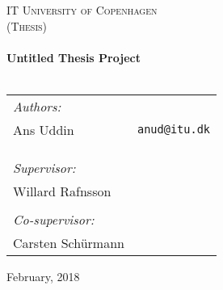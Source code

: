 \begin{center}
  \thispagestyle{empty}

  \textsc{\LARGE IT University of Copenhagen}\\[0.5cm]
  \textsc{\Large  (Thesis)}\\[2cm]

  \HRule\\[0.4cm]
  {\huge \bfseries Untitled Thesis Project \\ [0.4cm]}
  \HRule\\[3cm]

  \begin{tabular}{lr}
  	\textit{Authors:} \\
    Ans Uddin                     & \texttt{anud@itu.dk} \\
    \\
    \\
    \\
    \textit{Supervisor:}\\
    Willard Rafnsson \\
    \\
    \textit{Co-supervisor:}\\
    Carsten Schürmann\\
  \end{tabular}

  \vfill
  {\large February, 2018}
\end{center}
